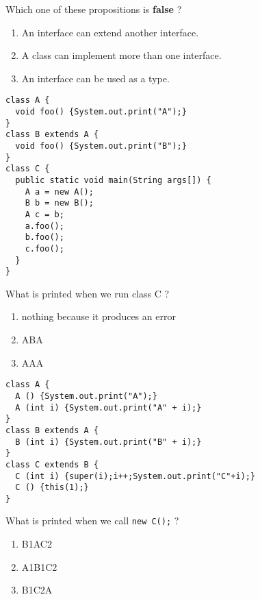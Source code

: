 \documentclass[correction]{exercices}
\begin{document}
\begin{question}
Which one of these propositions is \textbf{false} ?
\begin{enumerate}
\item An interface can extend another interface.
\item A class can implement more than one interface.
\item An interface can be used as a type.
\end{enumerate}
\end{question}

\begin{question}
\hfill

\begin{verbatim}
class A {
  void foo() {System.out.print("A");}
}
class B extends A {
  void foo() {System.out.print("B");}
}
class C {
  public static void main(String args[]) {
    A a = new A();
    B b = new B();
    A c = b;
    a.foo();
    b.foo();
    c.foo();
  }
}
\end{verbatim}

What is printed when we run class C ?
\begin{multicols}{2}
\begin{enumerate}
\item nothing because it produces an error
\item ABA
\item AAA
\end{enumerate}
\end{multicols}
\end{question}


\begin{question}
\hfill

\begin{verbatim}
class A {
  A () {System.out.print("A");}
  A (int i) {System.out.print("A" + i);}
}
class B extends A {
  B (int i) {System.out.print("B" + i);}
}
class C extends B {
  C (int i) {super(i);i++;System.out.print("C"+i);}
  C () {this(1);}
}
\end{verbatim}

What is printed when we call \lstinline!new C();! ?
\begin{multicols}{2}
\begin{enumerate}
\item B1AC2
\item A1B1C2
\item B1C2A
\end{enumerate}
\end{multicols}
\end{question}
\end{document}
